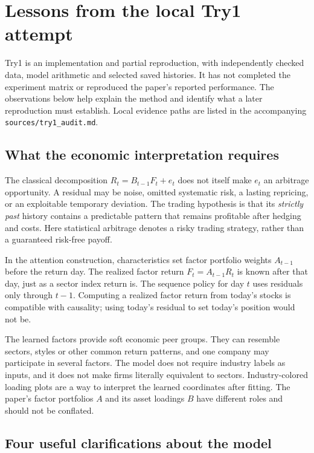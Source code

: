 \documentclass[11pt]{article}
\begin{document}
\section{Lessons from the local Try1 attempt}
\label{sec:try1-lessons}

Try1 is an implementation and partial reproduction, with independently
checked data, model arithmetic and selected saved histories. It has not
completed the experiment matrix or reproduced the paper's reported
performance. The observations below help explain the method and identify
what a later reproduction must establish. Local evidence paths are listed
in the accompanying \texttt{sources/try1\_audit.md}.

\subsection{What the economic interpretation requires}

The classical decomposition $R_t=B_{t-1}F_t+e_t$ does not itself make
$e_t$ an arbitrage opportunity. A residual may be noise, omitted systematic
risk, a lasting repricing, or an exploitable temporary deviation. The
trading hypothesis is that its \emph{strictly past} history contains a
predictable pattern that remains profitable after hedging and costs.
Here statistical arbitrage denotes a risky trading strategy, rather than
a guaranteed risk-free payoff.

In the attention construction, characteristics set factor portfolio
weights $A_{t-1}$ before the return day. The realized factor return
$F_t=A_{t-1}R_t$ is known after that day, just as a sector index return is.
The sequence policy for day $t$ uses residuals only through $t-1$.
Computing a realized factor return from today's stocks is compatible with
causality; using today's residual to set today's position would not be.

The learned factors provide soft economic peer groups. They can resemble
sectors, styles or other common return patterns, and one company may
participate in several factors. The model does not require industry labels
as inputs, and it does not make firms literally equivalent to sectors.
Industry-colored loading plots are a way to interpret the learned
coordinates after fitting. The paper's factor portfolios $A$ and its
asset loadings $B$ have different roles and should not be conflated.

\subsection{Four useful clarifications about the model}
\end{document}
